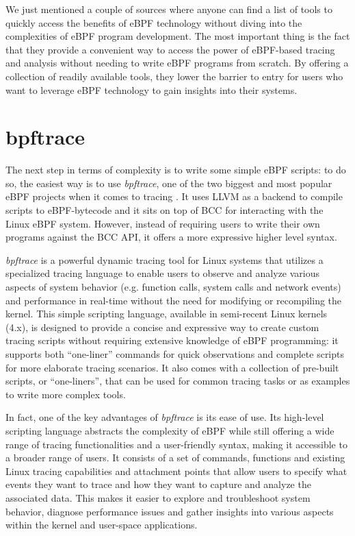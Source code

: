 We just mentioned a couple of sources where anyone can find a list of tools to quickly access the benefits of eBPF technology without diving into the complexities of eBPF program development.
The most important thing is the fact that they provide a convenient way to access the power of eBPF-based tracing and analysis without needing to write eBPF programs from scratch. 
By offering a collection of readily available tools, they lower the barrier to entry for users who want to leverage eBPF technology to gain insights into their systems.

%

\section{bpftrace}

The next step in terms of complexity is to write some simple eBPF scripts: to do so, the easiest way is to use \textit{bpftrace}, one of the two biggest and most popular eBPF projects when it comes to tracing \cite{bpftraceRepo}.
It uses LLVM as a backend to compile scripts to eBPF-bytecode and it sits on top of BCC for interacting with the Linux eBPF system.
However, instead of requiring users to write their own programs against the BCC API, it offers a more expressive higher level syntax.

\textit{bpftrace} is a powerful dynamic tracing tool for Linux systems that utilizes a specialized tracing language to enable users to observe and analyze various aspects of system behavior (e.g. function calls, system calls and network events) and performance in real-time without the need for modifying or recompiling the kernel.
This simple scripting language, available in semi-recent Linux kernels (4.x), is designed to provide a concise and expressive way to create custom tracing scripts without requiring extensive knowledge of eBPF programming: it supports both ``one-liner'' commands for quick observations and complete scripts for more elaborate tracing scenarios.
It also comes with a collection of pre-built scripts, or ``one-liners'', that can be used for common tracing tasks or as examples to write more complex tools. 

In fact, one of the key advantages of \textit{bpftrace} is its ease of use. 
Its high-level scripting language abstracts the complexity of eBPF while still offering a wide range of tracing functionalities and a user-friendly syntax, making it accessible to a broader range of users. 
It consists of a set of commands, functions and existing Linux tracing capabilities and attachment points that allow users to specify what events they want to trace and how they want to capture and analyze the associated data.
This makes it easier to explore and troubleshoot system behavior, diagnose performance issues and gather insights into various aspects within the kernel and user-space applications.

